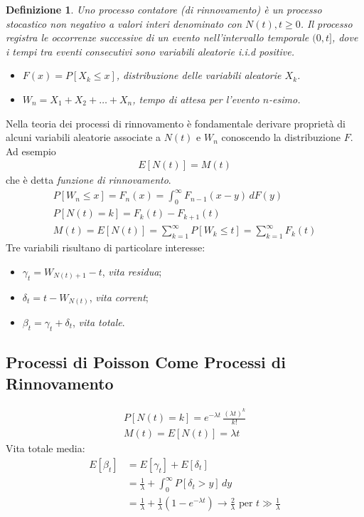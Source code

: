 \documentclass{article}
\newtheorem{definizione}{Definizione}[section]
\begin{document}
\begin{definizione}
Uno processo contatore (di rinnovamento) è un processo stocastico non negativo a valori interi denominato con $N(t), t \ge 0$. Il processo registra le occorrenze successive di un evento nell'intervallo temporale $(0,t]$, dove i tempi tra eventi consecutivi sono variabili aleatorie i.i.d positive.
\begin{itemize}
    \item $F(x) = P[X_k \le x]$, distribuzione delle variabili aleatorie $X_k$.
    \item $W_n = X_1+X_2+\hdots+X_n$, tempo di attesa per l'evento $n$-esimo.
\end{itemize}
\end{definizione}
Nella teoria dei processi di rinnovamento è fondamentale derivare proprietà di alcuni variabili aleatorie associate a $N(t)$ e $W_n$ conoscendo la distribuzione $F$. Ad esempio
\begin{align*}
E[N(t)] = M(t)
\end{align*}
che è detta \emph{funzione di rinnovamento}.
\begin{align*}
P[W_n \le x] = F_n(x) = \int_0^{\infty} F_{n-1}(x-y)\,dF(y)\\
P[N(t) = k] = F_k(t) - F_{k+1}(t)\\
M(t) = E[N(t)] = \sum_{k=1}^{\infty}P[W_k \le t]=\sum_{k=1}^{\infty}F_k(t)
\end{align*}
Tre variabili risultano di particolare interesse:
\begin{itemize}
    \item $\gamma_t = W_{N(t) + 1}-t$, \emph{vita residua};
    \item $\delta_t = t - W_{N(t)}$, \emph{vita corrent};
    \item $\beta_t = \gamma_t + \delta_t$, \emph{vita totale}.
\end{itemize}

\subsection{Processi di Poisson Come Processi di Rinnovamento}

\begin{gather*}
P[N(t) = k] = e^{-\lambda t}\,\frac{(\lambda t)^k}{k!}\\
M(t) = E[N(t)] = \lambda t
\end{gather*}
Vita totale media:
\begin{align*}
E[\beta_t] &= E[\gamma_t] + E[\delta_t]\\
&= \frac{1}{\lambda} + \int_0^{\infty}P[\delta_t > y]\,dy\\
&= \frac{1}{\lambda} + \frac{1}{\lambda}(1-e^{-\lambda t}) \to \frac{2}{\lambda} \text{ per } t \gg \frac{1}{\lambda}
\end{align*}
\end{document}
